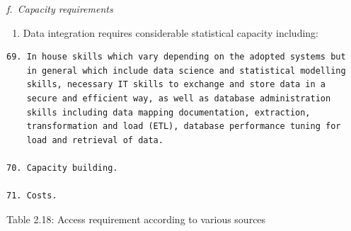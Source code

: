 \documentclass[
]{article}
\providecommand{\tightlist}{%
  \setlength{\itemsep}{0pt}\setlength{\parskip}{0pt}}
\begin{document}
\emph{f.~Capacity requirements}

\begin{enumerate}
\def\labelenumi{\arabic{enumi}.}
\setcounter{enumi}{211}
\tightlist
\item
  Data integration requires considerable statistical capacity
  including:
\end{enumerate}

\begin{verbatim}
69. In house skills which vary depending on the adopted systems but
    in general which include data science and statistical modelling
    skills, necessary IT skills to exchange and store data in a
    secure and efficient way, as well as database administration
    skills including data mapping documentation, extraction,
    transformation and load (ETL), database performance tuning for
    load and retrieval of data.

70. Capacity building.

71. Costs.
\end{verbatim}

Table 2.18: Access requirement according to various sources
\end{document}
